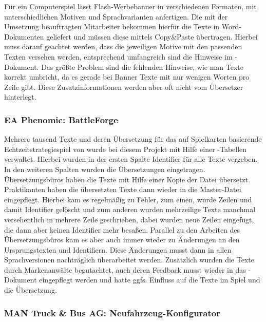 Für ein Computerspiel lässt  Flash-Werbebanner in verschiedenen Formaten, mit unterschiedlichen Motiven und Sprachvarianten anfertigen. Die mit der Umsetzung beauftragten Mitarbeiter bekommen hierfür die Texte in Word-Dokumenten geliefert und müssen diese mittels Copy\&Paste übertragen. Hierbei muss darauf geachtet werden, dass die jeweiligen Motive mit den passenden Texten versehen werden, entsprechend umfangreich sind die Hinweise im -Dokument. Das größte Problem sind die fehlenden Hinweise, wie man Texte korrekt umbricht, da es gerade bei Banner Texte mit nur wenigen Worten pro Zeile gibt. Diese Zusatzinformationen werden aber oft nicht vom Übersetzer hinterlegt.

\subsubsection{EA Phenomic: BattleForge}

Mehrere tausend Texte und deren Übersetzung für das auf Spielkarten basierende Echtzeitstrategiespiel  von  wurde bei diesem Projekt mit Hilfe einer -Tabellen verwaltet. Hierbei wurden in der ersten Spalte Identifier für alle Texte vergeben. In den weiteren Spalten wurden die Übersetzungen eingetragen. Übersetzungsbüros haben die Texte mit Hilfe einer Kopie der Datei übersetzt. Praktikanten haben die übersetzten Texte dann wieder in die Master-Datei eingepflegt. Hierbei kam es regelmäßig zu Fehler, zum einen, wurde Zeilen und damit Identifier gelöscht und zum anderen wurden mehrzeilige Texte manchmal versehentlich in mehrere Zeile geschrieben, dabei wurden neue Zeilen eingefügt, die dann aber keinen Identifier mehr besaßen. Parallel zu den Arbeiten des Übersetzungsbüros kam es aber auch immer wieder zu Änderungen an den Ursprungstexten und Identifiern. Diese Änderungen musst dann in allen Sprachversionen nachträglich überarbeitet werden. Zusätzlich wurden die Texte durch Markenanwälte begutachtet, auch deren Feedback musst wieder in das -Dokument eingepflegt werden und hatte ggfs. Einfluss auf die Texte im Spiel und die Übersetzung.

\subsubsection{MAN Truck \& Bus AG: Neufahrzeug-Konfigurator}

